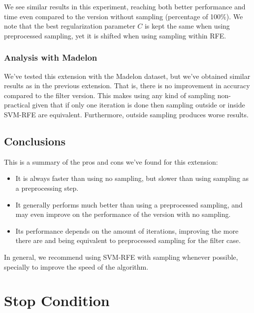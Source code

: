 We see similar results in this experiment, reaching both better performance and time even compared to the version without sampling (percentage of 100\%). We note that the best regularization parameter $C$ is kept the same when using preprocessed sampling, yet it is shifted when using sampling within RFE.

\subsubsection*{Analysis with Madelon}

We've tested this extension with the Madelon dataset, but we've obtained similar results as in the previous extension. That is, there is no improvement in accuracy compared to the filter version. This makes using any kind of sampling non-practical given that if only one iteration is done then sampling outside or inside SVM-RFE are equivalent. Furthermore, outside sampling produces worse results.

\subsection{Conclusions}

This is a summary of the pros and cons we've found for this extension:

\begin{itemize}
    \item It is always faster than using no sampling, but slower than using sampling as a preprocessing step.
    \item It generally performs much better than using a preprocessed sampling, and may even improve on the performance of the version with no sampling.
    \item Its performance depends on the amount of iterations, improving the more there are and being equivalent to preprocessed sampling for the filter case.
\end{itemize}

In general, we recommend using SVM-RFE with sampling whenever possible, specially to improve the speed of the algorithm.


\section{Stop Condition}

